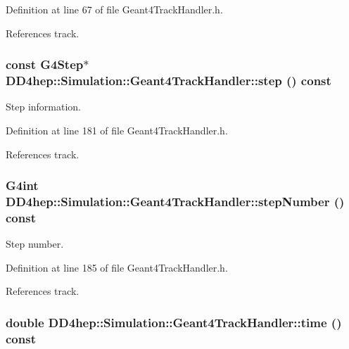 Definition at line 67 of file Geant4TrackHandler.h.

References track.\hypertarget{class_d_d4hep_1_1_simulation_1_1_geant4_track_handler_a751a9e1a533202afb900064702e76e61}{
\subsubsection[{step}]{\setlength{\rightskip}{0pt plus 5cm}const G4Step$\ast$ DD4hep::Simulation::Geant4TrackHandler::step () const}}
\label{class_d_d4hep_1_1_simulation_1_1_geant4_track_handler_a751a9e1a533202afb900064702e76e61}


Step information. 

Definition at line 181 of file Geant4TrackHandler.h.

References track.\hypertarget{class_d_d4hep_1_1_simulation_1_1_geant4_track_handler_aa9746a4283a024869e1cdedf62231926}{
\subsubsection[{stepNumber}]{\setlength{\rightskip}{0pt plus 5cm}G4int DD4hep::Simulation::Geant4TrackHandler::stepNumber () const}}
\label{class_d_d4hep_1_1_simulation_1_1_geant4_track_handler_aa9746a4283a024869e1cdedf62231926}


Step number. 

Definition at line 185 of file Geant4TrackHandler.h.

References track.\hypertarget{class_d_d4hep_1_1_simulation_1_1_geant4_track_handler_af8197965eb41bea4f5653a334fca2b7d}{
\subsubsection[{time}]{\setlength{\rightskip}{0pt plus 5cm}double DD4hep::Simulation::Geant4TrackHandler::time () const}}
\label{class_d_d4hep_1_1_simulation_1_1_geant4_track_handler_af8197965eb41bea4f5653a334fca2b7d}


